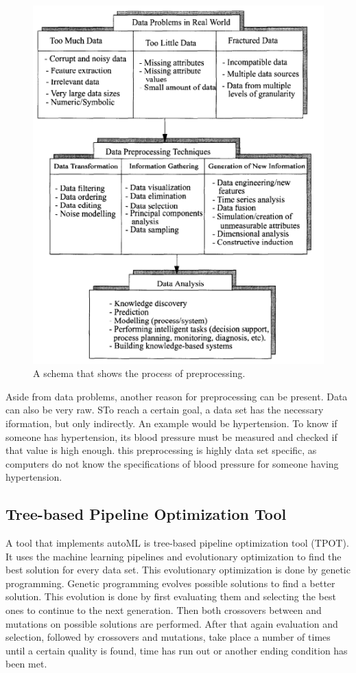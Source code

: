 \documentclass[10pt,a4paper]{article}
\begin{document}
 	\begin{figure}[h!]
 		\includegraphics[scale=1]{DataPreprocessing.png}
 		\caption{A schema that shows the process of preprocessing.\cite{famili1997data}}
 		\label{fig:DataPreprocessing}
 	\end{figure}
 	
 	Aside from data problems, another reason for preprocessing can be present.\cite{famili1997data} Data can also be very raw. STo reach a certain goal, a data set has the necessary iformation, but only indirectly. An example would be hypertension. To know if someone has hypertension, its blood pressure must be measured and checked if that value is high enough. this preprocessing is highly data set specific, as computers do not know the specifications of blood pressure for someone having hypertension. 
 	
	\subsection{Tree-based Pipeline Optimization Tool}
	\label{subsec:TPOT}
	
	A tool that implements autoML is tree-based pipeline optimization tool (TPOT). It uses the machine learning pipelines and evolutionary optimization to find the best solution for every data set. This evolutionary optimization is done by genetic programming. Genetic programming evolves possible solutions to find a better solution. This evolution is done by first evaluating them and selecting the best ones to continue to the next generation. Then both crossovers between and mutations on possible solutions are performed. After that again evaluation and selection, followed by crossovers and mutations, take place a number of times until a certain quality is found, time has run out or another ending condition has been met.
	
\end{document}
